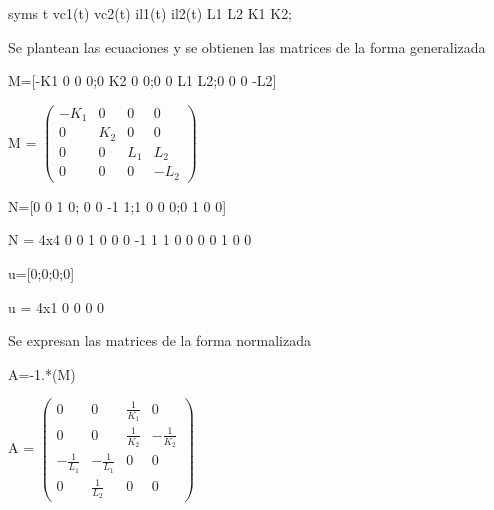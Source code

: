 \documentclass[10pt,a4paper]{article} %
\begin{document}
\begin{matlabcode}
	syms t vc1(t) vc2(t) il1(t) il2(t) L1 L2 K1 K2;
\end{matlabcode}

\begin{par}
	\begin{flushleft}
		Se plantean las ecuaciones y se obtienen las matrices de la forma generalizada
	\end{flushleft}
\end{par}

\begin{matlabcode}
	M=[-K1 0 0 0;0 K2 0 0;0 0 L1 L2;0 0 0 -L2]
\end{matlabcode}
\begin{matlabsymbolicoutput}
	M = 
	$\displaystyle \left(\begin{array}{cccc}
	-K_1  & 0 & 0 & 0\\
	0 & K_2  & 0 & 0\\
	0 & 0 & L_1  & L_2 \\
	0 & 0 & 0 & -L_2 
	\end{array}\right)$
\end{matlabsymbolicoutput}
\begin{matlabcode}
	N=[0 0 1 0; 0 0 -1 1;1 0 0 0;0 1 0 0]
\end{matlabcode}
\begin{matlaboutput}
	N = 4x4    
	0     0     1     0
	0     0    -1     1
	1     0     0     0
	0     1     0     0
	
\end{matlaboutput}
\begin{matlabcode}
	u=[0;0;0;0]
\end{matlabcode}
\begin{matlaboutput}
	u = 4x1    
	0
	0
	0
	0
	
\end{matlaboutput}

\begin{par}
	\begin{flushleft}
		Se expresan las matrices de la forma normalizada
	\end{flushleft}
\end{par}

\begin{matlabcode}
	A=-1.*(M\N)
\end{matlabcode}
\begin{matlabsymbolicoutput}
	A = 
	$\displaystyle \left(\begin{array}{cccc}
	0 & 0 & \frac{1}{K_1 } & 0\\
	0 & 0 & \frac{1}{K_2 } & -\frac{1}{K_2 }\\
	-\frac{1}{L_1 } & -\frac{1}{L_1 } & 0 & 0\\
	0 & \frac{1}{L_2 } & 0 & 0
	\end{array}\right)$
\end{matlabsymbolicoutput}
\end{document}
